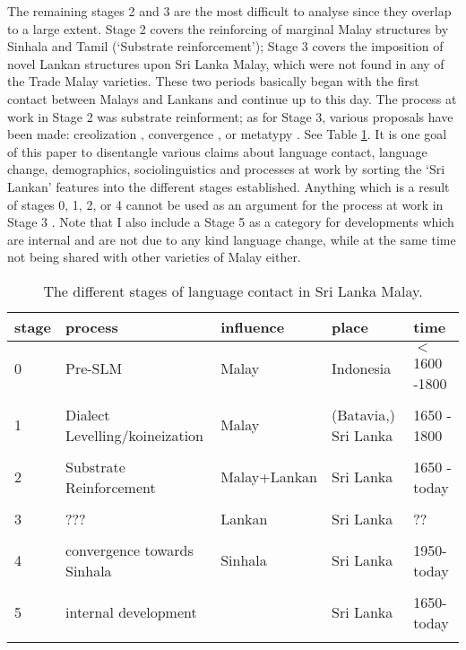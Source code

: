 The remaining stages 2 and 3 are the most difficult to analyse since they overlap to a large extent. Stage 2 covers the reinforcing of marginal Malay structures by Sinhala and Tamil (`Substrate reinforcement'); Stage 3 covers the imposition of novel Lankan structures upon Sri Lanka Malay, which were not found in any of the Trade Malay varieties.
These two periods basically began with the first contact between Malays and Lankans and continue up to this day. The process at work in Stage 2 was substrate reinforment; as for Stage 3, various proposals have been made: creolization \citep{SmithEtAl2004}, convergence \citep{Bakker2006}, or metatypy \citep{Ansaldo2008genesis}. See Table \ref{tab:stages}. It is one goal of this paper to disentangle various claims about language contact, language change, demographics, sociolinguistics and processes at work by sorting the `Sri Lankan' features into the different stages established. Anything which is a result of stages 0, 1, 2, or 4 cannot be used as an argument for the process at work in Stage 3 \citep[cf.][]{Smithtv,Slomansontv}. Note that I also include a Stage 5 as a category for developments which are internal and are not due to any kind language change, while at the same time not being shared with other varieties of Malay either.  

\begin{table}[h]
\begin{tabular}{lp{3cm}lll}
stage & process & influence & place & time\\
\hline 
  0 & Pre-SLM	 		 	& Malay 	& Indonesia 		& $<$1600 -1800\\\\
  1 & Dialect Levelling/koineization    & Malay 	& (Batavia,) Sri Lanka 	& 1650 - 1800\\\\
  2 & Substrate Reinforcement 		& Malay+Lankan	& Sri Lanka 		& 1650 - today\\\\
  3 & ???                     		& Lankan	& Sri Lanka 		& ?? \\\\
  4 & convergence towards Sinhala 	& Sinhala	& Sri Lanka 		& 1950-today\\\\
  5 & internal development 		&		& Sri Lanka 		& 1650-today \\\\	
\end{tabular}
\caption{The different stages of language contact in Sri Lanka Malay.}
\label{tab:stages}
\end{table}

